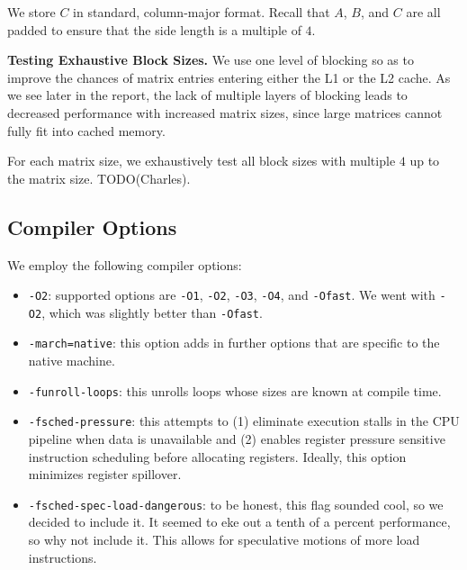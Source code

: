 \documentclass{article} %
\begin{document}
We store $C$ in standard, column-major format. Recall that $A$, $B$, and $C$
are all padded to ensure that the side length is a multiple of $4$.

\textbf{Testing Exhaustive Block Sizes.} We use one level of blocking so as to
improve the chances of matrix entries entering either the L1 or the L2 cache. As
we see later in the report, the lack of multiple layers of blocking leads to
decreased performance with increased matrix sizes, since large matrices cannot
fully fit into cached memory.

For each matrix size, we exhaustively test all block sizes with multiple $4$ up
to the matrix size. TODO(Charles).

\subsection{Compiler Options}
We employ the following compiler options:
\begin{itemize}
  \item \texttt{-O2}: supported options are \texttt{-O1}, \texttt{-O2},
    \texttt{-O3}, \texttt{-O4}, and \texttt{-Ofast}.
    We went with \texttt{-O2}, which was slightly better than \texttt{-Ofast}.
  \item \texttt{-march=native}: this option adds in further options that are
    specific to the native machine.
  \item \texttt{-funroll-loops}: this unrolls loops whose sizes are known at
    compile time.
  \item \texttt{-fsched-pressure}: this attempts to (1) eliminate execution
    stalls in the CPU pipeline when data is unavailable and (2) enables register
    pressure sensitive instruction scheduling before allocating registers.
    Ideally, this option minimizes register spillover.
  \item \texttt{-fsched-spec-load-dangerous}: to be honest, this flag sounded
    cool, so we decided to include it. It seemed to eke out a tenth of a percent
    performance, so why not include it. This allows for speculative motions of
    more load instructions.
\end{itemize}

\small


\end{document}
